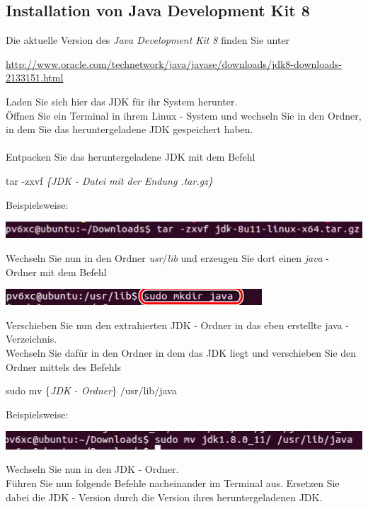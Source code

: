 \documentclass[a4paper, 12pt]{scrreprt}
\begin{document}
\subsection{Installation von Java Development Kit 8}
Die aktuelle Version des {\it Java Development Kit 8} finden Sie unter
\begin{center}
	\url{http://www.oracle.com/technetwork/java/javase/downloads/jdk8-downloads-2133151.html}
\end{center}
Laden Sie sich hier das JDK für ihr System herunter.\\
Öffnen Sie ein Terminal in ihrem Linux - System und wechseln Sie in den Ordner, in dem Sie das heruntergeladene JDK gespeichert haben.\\
\ \\
Entpacken Sie das heruntergeladene JDK mit dem Befehl
\begin{center}
	tar -zxvf {\it \{JDK - Datei mit der Endung .tar.gz\} }
\end{center}
Beispielsweise:
\begin{center}
\includegraphics[width=0.85\linewidth]{Grafiken/Linux_Java_pfad}
\end{center}
Wechseln Sie nun in den Ordner {\it usr$/$lib} und erzeugen Sie dort einen {\it java} - Ordner mit dem Befehl
\begin{center}
\includegraphics[width=0.6\linewidth]{Grafiken/Linux_create_java}
\end{center}
Verschieben Sie nun den extrahierten JDK - Ordner in das eben erstellte java - Verzeichnis.\\
Wechseln Sie dafür in den Ordner in dem das JDK liegt und verschieben Sie den Ordner mittels des Befehls
\begin{center}
	sudo mv \{{\it JDK - Ordner}\} $/$usr$/$lib$/$java
\end{center}
Beispielsweise: 
\begin{center}
\includegraphics[width=0.75\linewidth]{Grafiken/Linux_Move_befehl}
\end{center}
Wechseln Sie nun in den JDK - Ordner. \\
Führen Sie nun folgende Befehle nacheinander im Terminal aus. Ersetzen Sie dabei die JDK - Version durch die Version ihres heruntergeladenen JDK.
\end{document}
